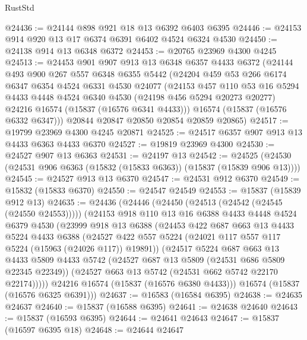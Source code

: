 \begin{lexlean}{RustStd}
\begin{coremodule}
@24436 := @24144 @898 @921 @18 @13 @6392 @6403 @6395
@24446 := @24153 @914 @920 @13 @17 @6374 @6391 @6402 @4524 @6324 @4530
@24450 := @24138 @914 @13 @6348 @6372
@24453 := @20765 @23969 @4300 @4245
@24513 := @24453
    @901
    @907
    @913
    @13
    @6348
    @6357
    @4433
    @6372
    (@24144
      @493
      @900
      @267
      @557
      @6348
      @6355
      @5442
      (@24204
        @459
        @53
        @266
        @6174
        @6347
        @6354
        @4524
        @6331
        @4530
        @24077
        (@24153
          @457
          @110
          @53
          @16
          @5294
          @4433
          @4448
          @4524
          @6340
          @4530
          (@24198 @456 @5294 @20273 @20277)
          @24216
          @16574
          (@15837 (@16576 @6341 @4433)))
        @16574
        (@15837 (@16576 @6332 @6347)))
      @20844
      @20847
      @20850
      @20854
      @20859
      @20865)
@24517 := @19799 @23969 @4300 @4245 @20871
@24525 := @24517 @6357 @907 @913 @13 @4433 @6363 @4433 @6370
@24527 := @19819 @23969 @4300
@24530 := @24527 @907 @13 @6363
@24531 := @24197 @13
@24542 := @24525 (@24530 (@24531 @906 @6363 (@15832 (@15833 @6363)) (@15837 (@15839 @906 @13))))
@24545 := @24527 @913 @13 @6370
@24547 := @24531 @912 @6370
@24549 := @15832 (@15833 @6370)
@24550 := @24547 @24549
@24553 := @15837 (@15839 @912 @13)
@24635 := @24436
    (@24446
      (@24450 (@24513 (@24542 (@24545 (@24550 @24553)))))
      (@24153
        @918
        @110
        @13
        @16
        @6388
        @4433
        @4448
        @4524
        @6379
        @4530
        (@23999
          @918
          @13
          @6388
          (@24453
            @422
            @687
            @663
            @13
            @4433
            @5224
            @4433
            @6388
            (@24527 @422 @557 @5224 (@24021 @117 @557 @117 @5224 (@15963 (@24026 @117)) @19891))
            (@24517
              @5224
              @687
              @663
              @13
              @4433
              @5809
              @4433
              @5742
              (@24527 @687 @13 @5809 (@24531 @686 @5809 @22345 @22349))
              (@24527 @663 @13 @5742 (@24531 @662 @5742 @22170 @22174)))))
        @24216
        @16574
        (@15837 (@16576 @6380 @4433)))
      @16574
      (@15837 (@16576 @6325 @6391)))
@24637 := @16583 (@16584 @6395)
@24638 := @24635 @24637
@24640 := @15837 (@16588 @6395)
@24641 := @24638 @24640
@24643 := @15837 (@16593 @6395)
@24644 := @24641 @24643
@24647 := @15837 (@16597 @6395 @18)
@24648 := @24644 @24647

\end{coremodule}
\end{lexlean}
